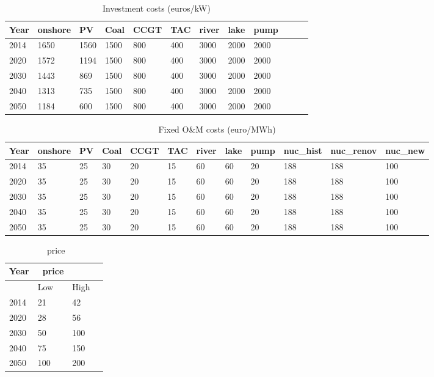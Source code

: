 \begin{table}[!ht]
	\centering
	\caption{Investment costs (euros/kW)}
	\label{tab:Investment _costs}
	\begin{adjustbox}{width=1\textwidth}
	\small
	\begin{tabular}{llllllllllll}
		\toprule
		 Year & onshore & PV & Coal & CCGT & TAC & river & lake & pump  \\
		\midrule
		2014 & 1650 & 1560 & 1500 & 800 & 400 & 3000 & 2000 & 2000  \\
		2020 & 1572 & 1194 & 1500 & 800 & 400 & 3000 & 2000 & 2000 \\
		2030 & 1443 & 869 & 1500 & 800 & 400 & 3000 & 2000 & 2000  \\
		2040 & 1313 & 735 & 1500 & 800 & 400 & 3000 & 2000 & 2000 \\
		2050 & 1184 & 600 & 1500 & 800 & 400 & 3000 & 2000 & 2000 \\
		\bottomrule
	\end{tabular}
\end{adjustbox}
\end{table}

\begin{table}[!ht]
	\centering
	\caption{Fixed O\&M costs (euro/MWh)}
	\label{tab:OM_costs}
		\begin{adjustbox}{width=1\textwidth}
	\small
	\begin{tabular}{llllllllllll}
		\toprule
		Year & onshore & PV & Coal & CCGT & TAC & river & lake & pump & nuc\_hist & nuc\_renov & nuc\_new \\
		\midrule
		2014 & 35 & 25 & 30 & 20 & 15 & 60 & 60 & 20 & 188 & 188 & 100 \\
		2020 & 35 & 25 & 30 & 20 & 15 & 60 & 60 & 20 & 188 & 188 & 100 \\
		2030 & 35 & 25 & 30 & 20 & 15 & 60 & 60 & 20 & 188 & 188 & 100 \\
		2040 & 35 & 25 & 30 & 20 & 15 & 60 & 60 & 20 & 188 & 188 & 100 \\
		2050 & 35 & 25 & 30 & 20 & 15 & 60 & 60 & 20 & 188 & 188 & 100 \\
		\bottomrule
	\end{tabular}
\end{adjustbox}
\end{table}


\begin{table}
	\centering
	\caption{\coo\ price}
	\label{tab:CO2_price}
	\begin{tabular}{llll}
		\toprule
		Year & \coo\ price & & \\
		\midrule
		& Low & High \\
		2014 & 21 & 42 \\
		2020 & 28 & 56 \\
		2030 & 50 & 100 \\
		2040 & 75 & 150 \\
		2050 & 100 & 200 \\
		\bottomrule
	\end{tabular}
\end{table}



